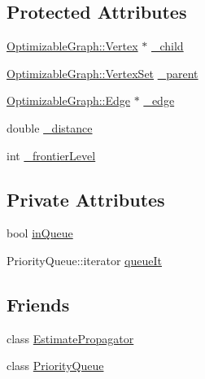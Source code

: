 \subsection*{Protected Attributes}
\begin{DoxyCompactItemize}
\item 
\hyperlink{classg2o_1_1OptimizableGraph_1_1Vertex}{Optimizable\+Graph\+::\+Vertex} $\ast$ \hyperlink{classg2o_1_1EstimatePropagator_1_1AdjacencyMapEntry_ab6f716e85cc15e6d9c570132fe889fd6}{\+\_\+child}
\item 
\hyperlink{classg2o_1_1HyperGraph_a703938cdb4bb636860eed55a2489d70c}{Optimizable\+Graph\+::\+Vertex\+Set} \hyperlink{classg2o_1_1EstimatePropagator_1_1AdjacencyMapEntry_a72384502361d60e1f3ae1644de1e7379}{\+\_\+parent}
\item 
\hyperlink{classg2o_1_1OptimizableGraph_1_1Edge}{Optimizable\+Graph\+::\+Edge} $\ast$ \hyperlink{classg2o_1_1EstimatePropagator_1_1AdjacencyMapEntry_a738795d0b3989374ba51821354629d64}{\+\_\+edge}
\item 
double \hyperlink{classg2o_1_1EstimatePropagator_1_1AdjacencyMapEntry_a3558503af9d9f56088ff1593398f86d4}{\+\_\+distance}
\item 
int \hyperlink{classg2o_1_1EstimatePropagator_1_1AdjacencyMapEntry_a56bfab4074fa692f03378526007758f7}{\+\_\+frontier\+Level}
\end{DoxyCompactItemize}
\subsection*{Private Attributes}
\begin{DoxyCompactItemize}
\item 
bool \hyperlink{classg2o_1_1EstimatePropagator_1_1AdjacencyMapEntry_a6697b7728a51b80663f843daba54e2d8}{in\+Queue}
\item 
Priority\+Queue\+::iterator \hyperlink{classg2o_1_1EstimatePropagator_1_1AdjacencyMapEntry_a40828826b865378855fdc26fae46af11}{queue\+It}
\end{DoxyCompactItemize}
\subsection*{Friends}
\begin{DoxyCompactItemize}
\item 
class \hyperlink{classg2o_1_1EstimatePropagator_1_1AdjacencyMapEntry_a84fd16bbb058a331370b1b9983896264}{Estimate\+Propagator}
\item 
class \hyperlink{classg2o_1_1EstimatePropagator_1_1AdjacencyMapEntry_afde21c6f1b41de5a73362b2fcfec056b}{Priority\+Queue}
\end{DoxyCompactItemize}


